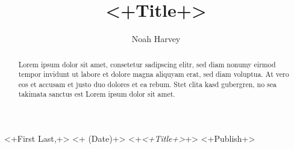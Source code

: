 \documentclass[a4paper,titlepage]{article}
\begin{document}
	\title{<+Title+>}
	\author{Noah Harvey}
	\maketitle

	\begin{abstract}

	Lorem ipsum dolor sit amet, consetetur sadipscing elitr, sed diam nonumy eirmod
	tempor invidunt ut labore et dolore magna aliquyam erat, sed diam voluptua. At
	vero eos et accusam et justo duo dolores et ea rebum. Stet clita kasd gubergren,
	no sea takimata sanctus est Lorem ipsum dolor sit amet.

	\end{abstract}

	\tableofcontents
	\listoftables
	\listoffigures

	\pagebreak
	
	


	\begin{thebibliography}{9}
			<+First Last,+>
			<+ (Date)+>
			<+\emph{<+Title+>}+>
			<+Publish+>
	\end{thebibliography}
\end{document}
